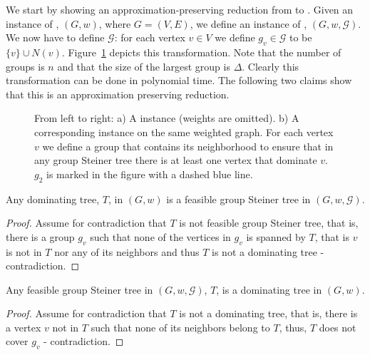 We start by showing an approximation-preserving reduction from \Prob{} to
\ProbGroup{}.
Given an instance of \Prob{}, $(G, w)$, where $G = (V, E)$, 
we define an instance of \ProbGroup{},
$(G, w, \mathcal{G})$.
We now have to define $\mathcal{G}$: for each vertex $v \in V$ we define 
$g_v \in \mathcal{G}$ to be $\{v\} \cup N(v)$.
Figure~\ref{fig:prob-leq-group} depicts this transformation.
Note that the number of groups is $n$ and that the size of the largest group is $\Delta$.
Clearly this transformation can be done in polynomial time.
The following two claims show that this is an approximation preserving reduction. 

\begin{figure}
\begin{center}

\end{center}
\caption{\label{fig:prob-leq-group}
From left to right:
a) A \Prob{} instance (weights are omitted).
b) A corresponding \ProbGroup{} instance on the same weighted graph.
For each vertex $v$ we define a group
that contains its neighborhood to ensure that in any group Steiner tree there is at least
one vertex that dominate $v$.
$g_2$ is marked in the figure with a dashed blue line.  
}
\end{figure}

\begin{claim}
Any dominating tree, $T$, in $(G, w)$ 
is a feasible group Steiner tree in $(G, w, \mathcal{G})$.
\end{claim}

\begin{proof}
Assume for contradiction that $T$ is not feasible group Steiner tree, that is, there is 
a group $g_v$ such that none of the vertices in $g_v$ is spanned by $T$, that is $v$
is not in $T$ nor any of its neighbors and thus $T$ is not a dominating tree - contradiction. 
\end{proof}
 
\begin{claim}
Any feasible group Steiner tree in $(G, w, \mathcal{G})$, $T$, is a dominating tree
in $(G, w)$.
\end{claim}

\begin{proof}
Assume for contradiction that $T$ is not a dominating tree, that is, there is 
a vertex $v$ not in $T$ such that none of its neighbors belong to $T$, thus, 
$T$ does not cover $g_v$ - contradiction. 
\end{proof}
